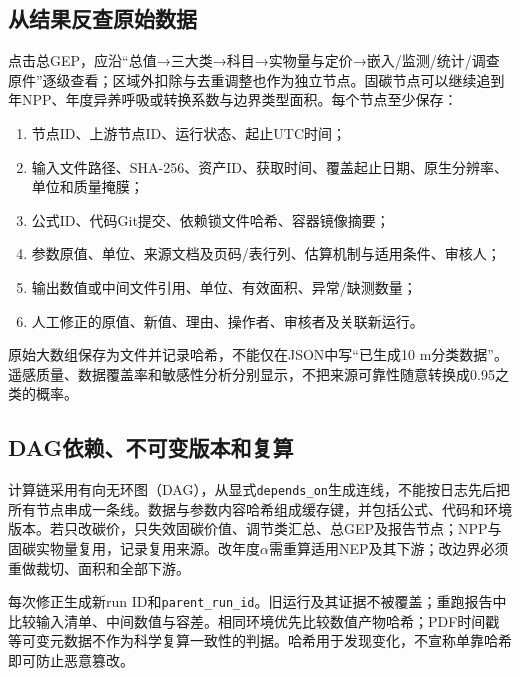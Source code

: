 \documentclass[12pt,a4paper,fontset=fandol]{ctexart}
\newcommand{\file}[1]{\nolinkurl{#1}}
\begin{document}
\subsection{从结果反查原始数据}
点击总GEP，应沿“总值→三大类→科目→实物量与定价→嵌入/监测/统计/调查原件”逐级查看；区域外扣除与去重调整也作为独立节点。固碳节点可以继续追到年NPP、年度异养呼吸或转换系数与边界类型面积。每个节点至少保存：
\begin{enumerate}
\item 节点ID、上游节点ID、运行状态、起止UTC时间；
\item 输入文件路径、SHA-256、资产ID、获取时间、覆盖起止日期、原生分辨率、单位和质量掩膜；
\item 公式ID、代码Git提交、依赖锁文件哈希、容器镜像摘要；
\item 参数原值、单位、来源文档及页码/表行列、估算机制与适用条件、审核人；
\item 输出数值或中间文件引用、单位、有效面积、异常/缺测数量；
\item 人工修正的原值、新值、理由、操作者、审核者及关联新运行。
\end{enumerate}
原始大数组保存为文件并记录哈希，不能仅在JSON中写“已生成10 m分类数据”。遥感质量、数据覆盖率和敏感性分析分别显示，不把来源可靠性随意转换成0.95之类的概率。

\subsection{DAG依赖、不可变版本和复算}
计算链采用有向无环图（DAG），从显式\file{depends_on}生成连线，不能按日志先后把所有节点串成一条线。数据与参数内容哈希组成缓存键，并包括公式、代码和环境版本。若只改碳价，只失效固碳价值、调节类汇总、总GEP及报告节点；NPP与固碳实物量复用，记录复用来源。改年度$\alpha$需重算适用NEP及其下游；改边界必须重做裁切、面积和全部下游。

每次修正生成新run ID和\file{parent_run_id}。旧运行及其证据不被覆盖；重跑报告中比较输入清单、中间数值与容差。相同环境优先比较数值产物哈希；PDF时间戳等可变元数据不作为科学复算一致性的判据。哈希用于发现变化，不宣称单靠哈希即可防止恶意篡改。
\end{document}
